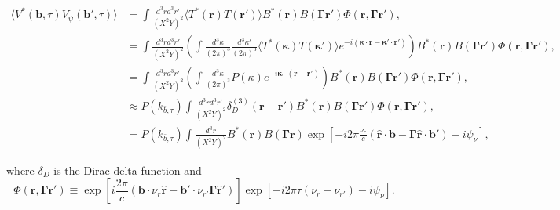 \documentclass[twocolumn,apj,numberedappendix]{emulateapj}
\renewcommand\[{\begin{equation}}
\renewcommand\]{\end{equation}}
\begin{document}
\begin{widetext}
\begin{equation}
\begin{aligned} \langle V^{*}(\boldsymbol{b},\tau)V_{\psi}(\boldsymbol{b'},\tau)\rangle
 & =\int \frac{d^{3}rd^{3}r'}{(X^2Y)^2}\langle T^{*}(\boldsymbol{r})T(\boldsymbol{r'})\rangle B^{*}(\boldsymbol{r})B(\boldsymbol{\Gamma} \boldsymbol{r'})\Phi(\boldsymbol{r},\boldsymbol{\Gamma} \boldsymbol{r'}),\\
 & =\int \frac{d^{3}rd^{3}r'}{(X^2Y)^2}\left(\int\frac{d^{3}\kappa}{(2\pi)^{3}}\frac{d^{3}\kappa'}{(2\pi)^{3}}\langle T^{*}(\boldsymbol{\kappa})T(\boldsymbol{\kappa'})\rangle e^{-i(\boldsymbol{\kappa}\cdot \boldsymbol{r}-\boldsymbol{\kappa'}\cdot\boldsymbol{r'})}\right)B^{*}(\boldsymbol{r})B(\boldsymbol{\Gamma} \boldsymbol{r'})\Phi(\boldsymbol{r},\boldsymbol{\Gamma} \boldsymbol{r'}),\\
 & =\int \frac{d^{3}rd^{3}r'}{(X^2Y)^2}\left(\int\frac{d^{3}\kappa}{(2\pi)^{3}}P(\kappa)e^{-i\boldsymbol{\kappa}\cdot(\boldsymbol{r}-\boldsymbol{r'})}\right)B^{*}(\boldsymbol{r})B(\boldsymbol{\Gamma} \boldsymbol{r'})\Phi(\boldsymbol{r},\boldsymbol{\Gamma} \boldsymbol{r'}),\\
 & \approx P(k_{\bar{b}, \tau})\int \frac{d^{3}rd^{3}r'}{(X^2Y)^2} \delta_{D}^{(3)}(\boldsymbol{r}-\boldsymbol{r'})B^{*}(\boldsymbol{r})B(\boldsymbol{\Gamma} \boldsymbol{r'}) \Phi(\boldsymbol{r},\boldsymbol{\Gamma} \boldsymbol{r'}),\\
 & = P(k_{\bar{b}, \tau})\int \frac{d^{3}r}{(X^2Y)^2}B^{*}(\boldsymbol{r})B(\boldsymbol{\Gamma} \boldsymbol{r})\exp\left[-i2\pi\frac{\nu_{r}}{c}\left(\hat{\boldsymbol{r}}\cdot\boldsymbol{b}-\boldsymbol{\Gamma} \hat{\boldsymbol{r}}\cdot\boldsymbol{b'}\right)-i\psi_{\nu}\right],
\end{aligned}
\label{eq:main}
\end{equation}

where $\delta_D$ is the Dirac delta-function and
\begin{equation}
\Phi(\boldsymbol{r},\boldsymbol{\Gamma} \boldsymbol{r'})\equiv\exp\left[i\frac{2\pi}{c}\left(\boldsymbol{b}\cdot\nu_{r}\hat{\boldsymbol{r}}-\boldsymbol{b'}\cdot\nu_{r'}\boldsymbol{\Gamma}\hat{\boldsymbol{r}}'\right)\right]\exp\left[-i2\pi\tau\left(\nu_{r}-\nu_{r'}\right)-i\psi_{\nu}\right].
\end{equation}

\end{widetext}
\end{document}
